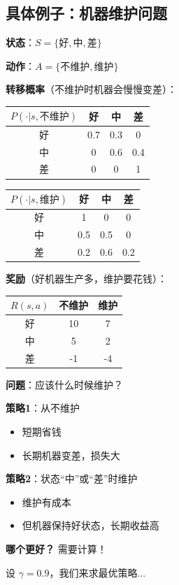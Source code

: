 \documentclass[12pt, a4paper]{ctexart}
\begin{document}
\subsection{具体例子：机器维护问题}

\begin{blackboard}

\textbf{状态}：$S = \{\text{好}, \text{中}, \text{差}\}$

\textbf{动作}：$A = \{\text{不维护}, \text{维护}\}$

\textbf{转移概率}（不维护时机器会慢慢变差）：

\begin{center}
\begin{tabular}{c|ccc}
$P(\cdot | s, \text{不维护})$ & 好 & 中 & 差 \\
\hline
好 & 0.7 & 0.3 & 0 \\
中 & 0 & 0.6 & 0.4 \\
差 & 0 & 0 & 1
\end{tabular}
\quad
\begin{tabular}{c|ccc}
$P(\cdot | s, \text{维护})$ & 好 & 中 & 差 \\
\hline
好 & 1 & 0 & 0 \\
中 & 0.5 & 0.5 & 0 \\
差 & 0.2 & 0.6 & 0.2
\end{tabular}
\end{center}

\textbf{奖励}（好机器生产多，维护要花钱）：

\begin{center}
\begin{tabular}{c|cc}
$R(s, a)$ & 不维护 & 维护 \\
\hline
好 & 10 & 7 \\
中 & 5 & 2 \\
差 & -1 & -4
\end{tabular}
\end{center}

\textbf{问题}：应该什么时候维护？

\end{blackboard}

\begin{blackboard}

\textbf{策略1}：从不维护
\begin{itemize}
    \item 短期省钱
    \item 长期机器变差，损失大
\end{itemize}

\textbf{策略2}：状态``中''或``差''时维护
\begin{itemize}
    \item 维护有成本
    \item 但机器保持好状态，长期收益高
\end{itemize}

\textbf{哪个更好？} 需要计算！

设 $\gamma = 0.9$，我们来求最优策略...

\end{blackboard}
\end{document}
